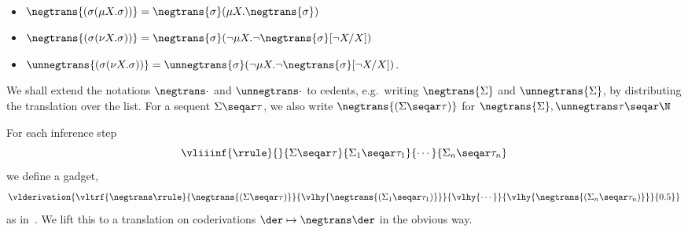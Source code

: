 \begin{proposition}
    [Substitution]{\ }
    \begin{itemize}
    \item $\negtrans{(\sigma (\mu X. \sigma  ))}=\negtrans{\sigma}(\mu X. \negtrans{\sigma}) $
    \item $\negtrans{(\sigma (\nu X. \sigma))} = \negtrans{\sigma}(\neg \mu X. \neg \negtrans{\sigma}[\neg X/X])$
     \item $\unnegtrans{(\sigma (\nu X. \sigma))} = \unnegtrans{\sigma}(\neg \mu X. \neg \negtrans{\sigma}[\neg X/X])$.
    \end{itemize}
\end{proposition}

We shall extend the notations $\negtrans \cdot$ and $\unnegtrans \cdot$ to cedents, e.g.\ writing $\negtrans {\Sigma}$ and $\unnegtrans {\Sigma}$, by distributing the translation over the list.
For a sequent $\Sigma \seqar \tau$, we also write $\negtrans{(\Sigma \seqar \tau)}$ for $\negtrans{\Sigma} , \unnegtrans \tau \seqar \N$





\begin{definition}
    For each inference step \[\vliiinf{\rrule}{}{\Sigma \seqar \tau}{\Sigma_1 \seqar \tau_1}{\cdots }{\Sigma_n \seqar \tau_n}\] we define a gadget,
    \[
    \toks0={0.5}
    \vlderivation{
    \vltrf{\negtrans \rrule}{\negtrans{(\Sigma \seqar \tau)}}{\vlhy{\negtrans{(\Sigma_1 \seqar \tau_1)}}}{\vlhy{\cdots}}{\vlhy{\negtrans{(\Sigma_n \seqar \tau_n)}}}{\the\toks0}
    }
    \]
    as in~.
       We lift this to a translation on coderivations $\der \mapsto \negtrans \der$ in the obvious way.
\end{definition}



